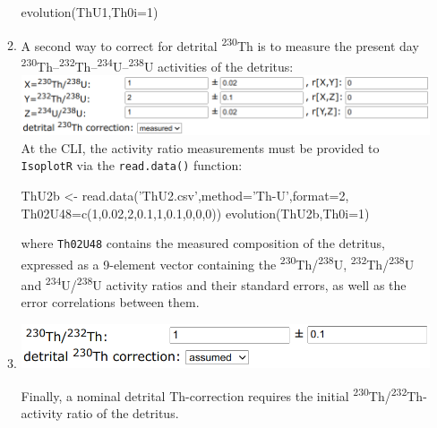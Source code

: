 \begin{refsection}
\begin{enumerate}
\begin{enumerate}
\begin{console}
evolution(ThU1,Th0i=1)
\end{console}

\item A second way to correct for detrital \textsuperscript{230}Th is
  to measure the present day
  \textsuperscript{230}Th--\textsuperscript{232}Th--\textsuperscript{234}U--\textsuperscript{238}U
  activities of the detritus:\\

  \noindent\includegraphics[width=\linewidth]{../figures/ThUmeasureddetritus.png}\\

At the CLI, the activity ratio measurements must be provided to
\texttt{IsoplotR} via the \texttt{read.data()} function:

\begin{script}
ThU2b <- read.data('ThU2.csv',method='Th-U',format=2,
                   Th02U48=c(1,0.02,2,0.1,1,0.1,0,0,0))
evolution(ThU2b,Th0i=1)
\end{script}

\noindent where \texttt{Th02U48} contains the measured composition of
the detritus, expressed as a 9-element vector containing the
\textsuperscript{230}Th/\textsuperscript{238}U,
\textsuperscript{232}Th/\textsuperscript{238}U and
\textsuperscript{234}U/\textsuperscript{238}U activity ratios and
their standard errors, as well as the error correlations between them.

  \item \begin{minipage}[t]{.7\linewidth}
    \strut\vspace*{-\baselineskip}\newline
    \includegraphics[width=\linewidth]{../figures/ThUinitialThassumed.png}
  \end{minipage}
    \begin{minipage}[t]{.3\linewidth}
      Finally, a nominal detrital Th-correction requires the initial
      \textsuperscript{230}Th/\textsuperscript{232}Th-activity ratio
      of the detritus.\\
    \end{minipage}


\end{enumerate}
\end{enumerate}
\end{refsection}
